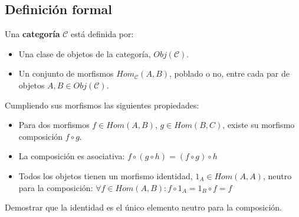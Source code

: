 \documentclass[a4paper, 11pt]{amsart}
\newcommand{\C}{\mathcal{C} }
\theoremstyle{definition}
\theoremstyle{remark}
\numberwithin{equation}{section}
\begin{document}
  \subsection {Definición formal}
    Una \textbf{categoría} $\C$ está definida por:
    \begin{itemize}
      \item Una clase de objetos de la categoría, $Obj(\mathcal{C})$.
      \item Un conjunto de morfismos $Hom_{\C}(A,B)$, poblado o no, entre cada par de objetos $A,B \in Obj(\C)$.
    \end{itemize}

    Cumpliendo sus morfismos las siguientes propiedades:
    \begin{itemize}
      \item Para dos morfismos $f \in Hom(A,B)$, $g \in Hom(B,C)$, existe su morfismo composición $f \circ g$.
      \item La composición es asociativa: $ f \circ (g \circ h) = (f \circ g) \circ h$
      \item Todos los objetos tienen un morfismo identidad, $1_{A} \in Hom(A,A)$, 
	  neutro para la composición: $\forall f \in Hom(A,B): f \circ 1_{A} = 1_{B} \circ f = f$
    \end{itemize}
    
    \exca Demostrar que la identidad es el único elemento neutro para la composición.
  
\end{document}
